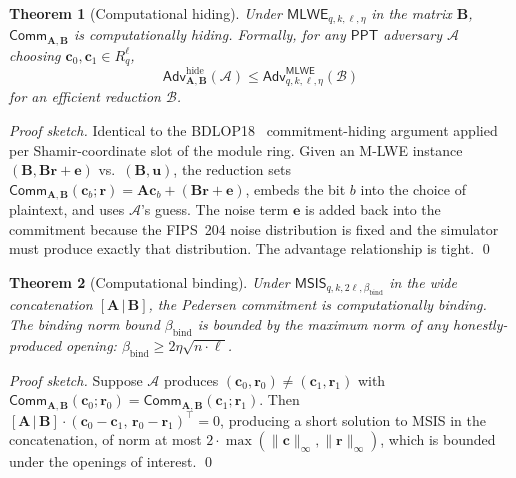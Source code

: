 \documentclass[11pt,a4paper]{article}
\newtheorem{theorem}{Theorem}
\theoremstyle{definition}
\theoremstyle{remark}
\newcommand{\Rq}{R_q}
\newcommand{\PPT}{\mathsf{PPT}}
\newcommand{\Adv}{\mathsf{Adv}}
\newcommand{\MLWE}{\mathsf{MLWE}}
\newcommand{\MSIS}{\mathsf{MSIS}}
\newcommand{\Comm}{\mathsf{Comm}}
\begin{document}
\begin{theorem}[Computational hiding]
\label{thm:pedersen-hiding}
Under $\MLWE_{q, k, \ell, \eta}$ in the matrix $\mathbf{B}$,
$\Comm_{\mathbf{A}, \mathbf{B}}$ is computationally hiding. Formally,
for any $\PPT$ adversary $\mathcal{A}$ choosing
$\mathbf{c}_0, \mathbf{c}_1 \in \Rq^\ell$,
\[
\Adv^{\mathrm{hide}}_{\mathbf{A}, \mathbf{B}}(\mathcal{A})
\le
\Adv^{\MLWE}_{q, k, \ell, \eta}(\mathcal{B})
\]
for an efficient reduction $\mathcal{B}$.
\end{theorem}

\begin{proof}[Proof sketch]
Identical to the BDLOP18~\cite{boschini2024corona} commitment-hiding
argument applied per Shamir-coordinate slot of the module ring.
Given an M-LWE instance $(\mathbf{B}, \mathbf{B}\mathbf{r} + \mathbf{e})$
vs.\ $(\mathbf{B}, \mathbf{u})$, the reduction sets
$\Comm_{\mathbf{A}, \mathbf{B}}(\mathbf{c}_b; \mathbf{r})
= \mathbf{A}\mathbf{c}_b + (\mathbf{B}\mathbf{r} + \mathbf{e})$, embeds
the bit $b$ into the choice of plaintext, and uses $\mathcal{A}$'s
guess. The noise term $\mathbf{e}$ is added back into the commitment
because the FIPS~204 noise distribution is fixed and the simulator
must produce exactly that distribution. The advantage
relationship is tight. \qed
\end{proof}

\begin{theorem}[Computational binding]
\label{thm:pedersen-binding}
Under $\MSIS_{q, k, 2\ell, \beta_{\mathrm{bind}}}$ in the wide
concatenation $[\mathbf{A} \,|\, \mathbf{B}]$, the Pedersen commitment
is computationally binding. The binding norm bound
$\beta_{\mathrm{bind}}$ is bounded by the maximum norm of any
honestly-produced opening:
$\beta_{\mathrm{bind}} \ge 2\eta\sqrt{n \cdot \ell}$.
\end{theorem}

\begin{proof}[Proof sketch]
Suppose $\mathcal{A}$ produces
$(\mathbf{c}_0, \mathbf{r}_0) \ne (\mathbf{c}_1, \mathbf{r}_1)$ with
$\Comm_{\mathbf{A},\mathbf{B}}(\mathbf{c}_0;\mathbf{r}_0)
= \Comm_{\mathbf{A},\mathbf{B}}(\mathbf{c}_1;\mathbf{r}_1)$. Then
$[\mathbf{A}\,|\,\mathbf{B}] \cdot
(\mathbf{c}_0 - \mathbf{c}_1,\,\mathbf{r}_0 - \mathbf{r}_1)^\top = 0$,
producing a short solution to MSIS in the concatenation, of norm
at most $2 \cdot \max(\|\mathbf{c}\|_\infty, \|\mathbf{r}\|_\infty)$,
which is bounded under the openings of interest. \qed
\end{proof}
\end{document}
